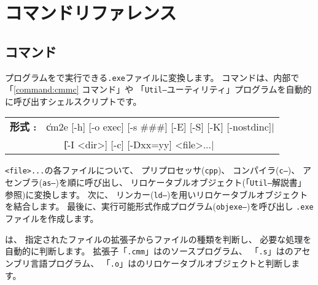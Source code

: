 % 
%
\chapter{コマンドリファレンス}
\label{app:command}


\section{{\cme}コマンド}

{\cmm}プログラムを{\tac}で実行できる{\tt .exe}ファイルに変換します。
{\cme}コマンドは、内部で「\ref{command:cmmc} {\cmmc}コマンド」や
「{\tt Util--}ユーティリティ」プログラムを自動的に呼び出すシェルスクリプトです。

\begin{flushleft}
\begin{tabular}{l l}
{\bf 形式 : } & \|cm2e [-h] [-o exec] [-s ###] [-E] [-S] [-K] [-nostdinc]|\\
              & ~~~ \|[-I <dir>] [-c] [-Dxx=yy] <file>...|
\end{tabular}
\end{flushleft}

{\tt <file>...}の各ファイルについて、
プリプロセッサ({\tt cpp})、
コンパイラ({\tt c--})、
アセンブラ({\tt as--})を順に呼び出し、
リロケータブルオブジェクト(「{\tt Util--}解説書」参照)に変換します。
次に、
リンカー({\tt ld--})を用いリロケータブルオブジェクトを結合します。
最後に、実行可能形式作成プログラム({\tt objexe--})を呼び出し
{\tt .exe}ファイルを作成します。

{\cme}は、
指定されたファイルの拡張子からファイルの種類を判断し、
必要な処理を自動的に判断します。
拡張子「{\tt .cmm}」は{\cmml}のソースプログラム、
「{\tt .s}」は{\tac}のアセンブリ言語プログラム、
「{\tt .o}」は{\tac}のリロケータブルオブジェクトと判断します。


